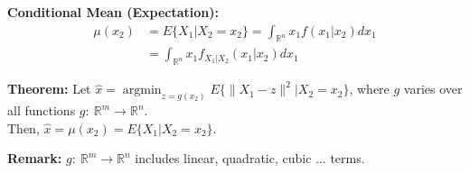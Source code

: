 \documentclass[letterpaper]{article}
\begin{document}
\noindent \textbf{Conditional Mean (Expectation):}
    \begin{align*}
        \mu(x_2)&=E\{X_1|X_2=x_2\}=\int_{\mathbb{R}^n}x_1f(x_1|x_2)dx_1\\
        &=\int_{\mathbb{R}^n}x_1f_{X_1|X_2}(x_1|x_2)dx_1
    \end{align*}

\noindent \textbf{Theorem:} Let $\hat{x}=\operatorname*{argmin}_{z=g(x_2)}E\{\|X_1-z\|^2|X_2=x_2\}$, where $g$ varies over all functions $g:\ \mathbb{R}^m\rightarrow\mathbb{R}^n$.\\
    Then, $\hat{x}=\mu(x_2)=E\{X_1|X_2=x_2\}$.

\noindent \textbf{Remark:} $g:\ \mathbb{R}^m\rightarrow\mathbb{R}^n$ includes linear, quadratic, cubic ... terms.
\end{document}
